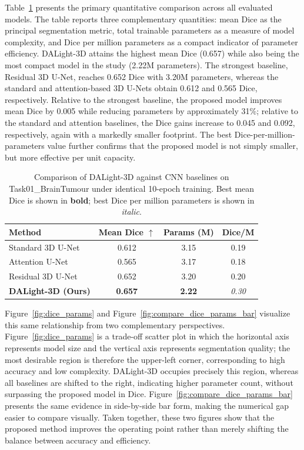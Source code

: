\documentclass[conference]{IEEEtran}
\begin{document}
Table~\ref{tab:comparison} presents the primary quantitative comparison across all evaluated models. The table reports three complementary quantities: mean Dice as the principal segmentation metric, total trainable parameters as a measure of model complexity, and Dice per million parameters as a compact indicator of parameter efficiency. DALight-3D attains the highest mean Dice (0.657) while also being the most compact model in the study (2.22M parameters). The strongest baseline, Residual 3D U-Net, reaches 0.652 Dice with 3.20M parameters, whereas the standard and attention-based 3D U-Nets obtain 0.612 and 0.565 Dice, respectively. Relative to the strongest baseline, the proposed model improves mean Dice by 0.005 while reducing parameters by approximately 31\%; relative to the standard and attention baselines, the Dice gains increase to 0.045 and 0.092, respectively, again with a markedly smaller footprint. The best Dice-per-million-parameters value further confirms that the proposed model is not simply smaller, but more effective per unit capacity.

\begin{table}[t]
\centering
\caption{Comparison of DALight-3D against CNN baselines on Task01\_BrainTumour under identical 10-epoch training. Best mean Dice is shown in \textbf{bold}; best Dice per million parameters is shown in \emph{italic}.}
\label{tab:comparison}
\begin{tabular}{lccc}
\toprule
Method & Mean Dice $\uparrow$ & Params (M) & Dice/M \\
\midrule
Standard 3D U-Net & 0.612 & 3.15 & 0.19 \\
Attention U-Net & 0.565 & 3.17 & 0.18 \\
Residual 3D U-Net & 0.652 & 3.20 & 0.20 \\
\textbf{DALight-3D (Ours)} & \textbf{0.657} & \textbf{2.22} & \emph{0.30} \\
\bottomrule
\end{tabular}
\end{table}

Figure~\ref{fig:dice_params} and Figure~\ref{fig:compare_dice_params_bar} visualize this same relationship from two complementary perspectives. Figure~\ref{fig:dice_params} is a trade-off scatter plot in which the horizontal axis represents model size and the vertical axis represents segmentation quality; the most desirable region is therefore the upper-left corner, corresponding to high accuracy and low complexity. DALight-3D occupies precisely this region, whereas all baselines are shifted to the right, indicating higher parameter count, without surpassing the proposed model in Dice. Figure~\ref{fig:compare_dice_params_bar} presents the same evidence in side-by-side bar form, making the numerical gap easier to compare visually. Taken together, these two figures show that the proposed method improves the operating point rather than merely shifting the balance between accuracy and efficiency.
\end{document}
